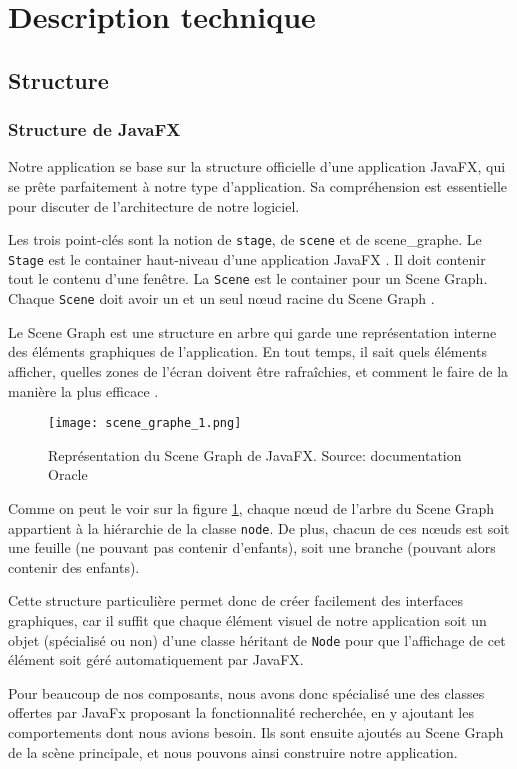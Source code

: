 \section{Description technique}

\subsection{Structure}
\subsubsection{Structure de JavaFX}
Notre application se base sur la structure officielle d'une application JavaFX, qui se prête parfaitement à notre type d'application. Sa compréhension est essentielle pour discuter de l'architecture de notre logiciel.
\par
Les trois point-clés sont la notion de \texttt{\gls{stage}}, de \texttt{\gls{scene}} et de \gls{scene_graphe}. Le \texttt{Stage} est le container haut-niveau d'une application JavaFX \cite{javadoc_stage}. Il doit contenir tout le contenu d'une fenêtre. La \texttt{Scene} est le container pour un Scene Graph. Chaque \texttt{Scene} doit avoir un et un seul n\oe ud racine du Scene Graph \cite{javadoc_scene}.
\par
Le Scene Graph est une structure en arbre qui garde une représentation interne des éléments graphiques de l'application. En tout temps, il sait quels éléments afficher, quelles zones de l'écran doivent être rafraîchies, et comment le faire de la manière la plus efficace \cite{javadoc_scene_graphe}. 	

\begin{figure}[!ht]
	\caption{Représentation du Scene Graph de JavaFX. Source: documentation Oracle \cite{javadoc_scene_graphe}}
	\centering
	\texttt{[image: scene\_graphe\_1.png]}
	\label{fig:scene_graphe_1}
\end{figure}
Comme on peut le voir sur la figure \ref{fig:scene_graphe_1}, chaque n\oe ud de l'arbre du Scene Graph appartient à la hiérarchie de la classe \texttt{\gls{node}}. De plus, chacun de ces n\oe uds est soit une feuille (ne pouvant pas contenir d'enfants), soit une branche (pouvant alors contenir des enfants).
\par
Cette structure particulière permet donc de créer facilement des interfaces graphiques, car il suffit que chaque élément visuel de notre application soit un objet (spécialisé ou non) d'une classe héritant de \texttt{Node} pour que l'affichage de cet élément soit géré automatiquement par JavaFX.
\par
Pour beaucoup de nos composants, nous avons donc spécialisé une des classes offertes par JavaFx proposant la fonctionnalité recherchée, en y ajoutant les comportements dont nous avions besoin. Ils sont ensuite ajoutés au Scene Graph de la scène principale, et nous pouvons ainsi construire notre application.

